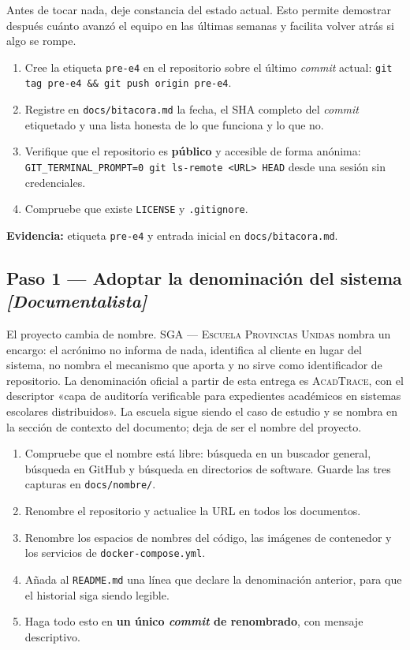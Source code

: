 \documentclass[11pt,a4paper]{article}
\newcommand{\paso}[1]{\subsection{#1}}
\begin{document}
	Antes de tocar nada, deje constancia del estado actual. Esto permite demostrar después cuánto avanzó el equipo en las últimas semanas y facilita volver atrás si algo se rompe.
	
	\begin{enumerate}[leftmargin=*,itemsep=3pt]
		\item Cree la etiqueta \texttt{pre-e4} en el repositorio sobre el último \emph{commit} actual: \texttt{git tag pre-e4 \&\& git push origin pre-e4}.
		\item Registre en \texttt{docs/bitacora.md} la fecha, el SHA completo del \emph{commit} etiquetado y una lista honesta de lo que funciona y lo que no.
		\item Verifique que el repositorio es \textbf{público} y accesible de forma anónima: \texttt{GIT\_TERMINAL\_PROMPT=0 git ls-remote <URL> HEAD} desde una sesión sin credenciales.
		\item Compruebe que existe \texttt{LICENSE} y \texttt{.gitignore}.
	\end{enumerate}
	
	\textbf{Evidencia:} etiqueta \texttt{pre-e4} y entrada inicial en \texttt{docs/bitacora.md}.
	
	\paso{Paso 1 --- Adoptar la denominación del sistema \emph{[Documentalista]}}
	
	El proyecto cambia de nombre. \textsc{SGA --- Escuela Provincias Unidas} nombra un encargo: el acrónimo no informa de nada, identifica al cliente en lugar del sistema, no nombra el mecanismo que aporta y no sirve como identificador de repositorio. La denominación oficial a partir de esta entrega es \textsc{AcadTrace}, con el descriptor «capa de auditoría verificable para expedientes académicos en sistemas escolares distribuidos». La escuela sigue siendo el caso de estudio y se nombra en la sección de contexto del documento; deja de ser el nombre del proyecto.
	
	\begin{enumerate}[leftmargin=*,itemsep=3pt]
		\item Compruebe que el nombre está libre: búsqueda en un buscador general, búsqueda en GitHub y búsqueda en directorios de software. Guarde las tres capturas en \texttt{docs/nombre/}.
		\item Renombre el repositorio y actualice la URL en todos los documentos.
		\item Renombre los espacios de nombres del código, las imágenes de contenedor y los servicios de \texttt{docker-compose.yml}.
		\item Añada al \texttt{README.md} una línea que declare la denominación anterior, para que el historial siga siendo legible.
		\item Haga todo esto en \textbf{un único \emph{commit} de renombrado}, con mensaje descriptivo.
	\end{enumerate}
	
\end{document}
